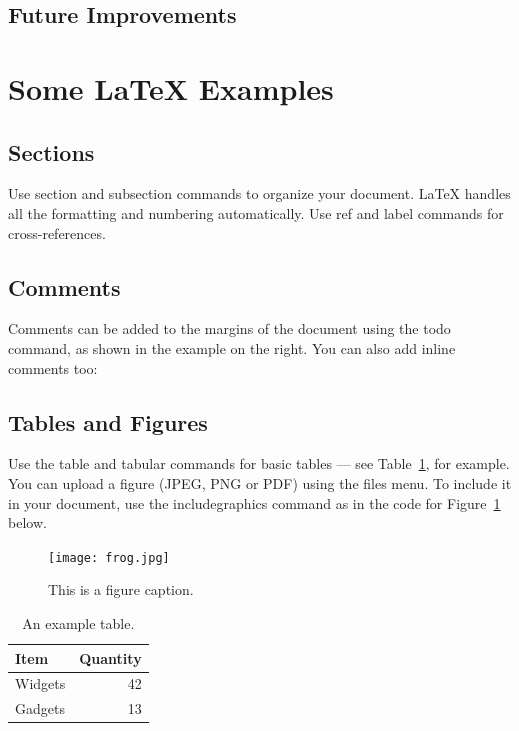 \documentclass[12pt]{article}
\begin{document}
\subsection{Future Improvements}


\section{Some \LaTeX{} Examples}
\label{sec:examples}

\subsection{Sections}

Use section and subsection commands to organize your document. \LaTeX{} handles all the formatting and numbering automatically. Use ref and label commands for cross-references.

\subsection{Comments}

Comments can be added to the margins of the document using the  todo command, as shown in the example on the right. You can also add inline comments too:


\subsection{Tables and Figures}

Use the table and tabular commands for basic tables --- see Table~\ref{tab:widgets}, for example. You can upload a figure (JPEG, PNG or PDF) using the files menu. To include it in your document, use the includegraphics command as in the code for Figure~\ref{fig:frog} below.

\begin{figure}
\centering
\texttt{[image: frog.jpg]}
\caption{\label{fig:frog}This is a figure caption.}
\end{figure}

\begin{table}
\centering
\begin{tabular}{l|r}
Item & Quantity \\\hline
Widgets & 42 \\
Gadgets & 13
\end{tabular}
\caption{\label{tab:widgets}An example table.}
\end{table}
\end{document}
